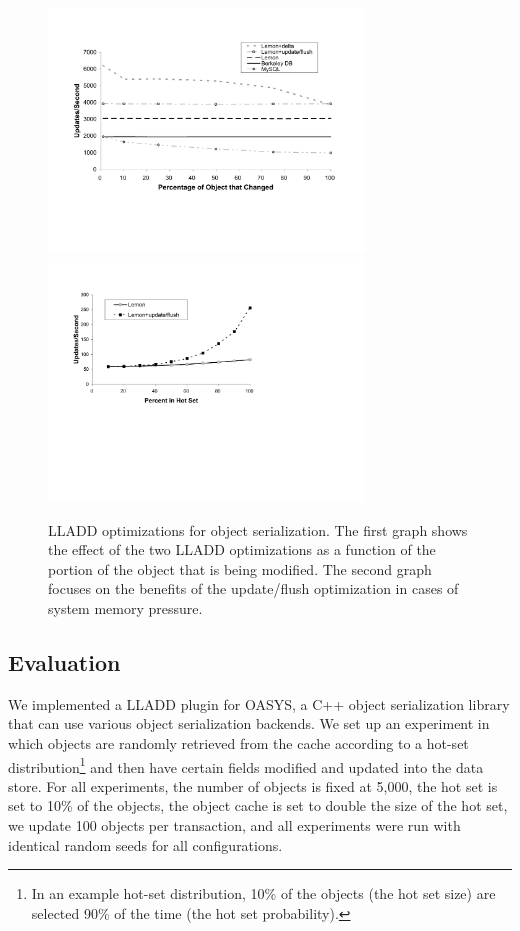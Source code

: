 \documentclass[10pt,letterpaper,twocolumn,english]{article}
\newcommand{\yad}{LLADD\xspace}
\newcommand{\oasys}{OASYS\xspace}
\begin{document}
\begin{figure}[t!]
\includegraphics[width=3.3in]{../paper2/object-diff.pdf}
\hspace{.3in}
\includegraphics[width=3.3in]{../paper2/mem-pressure.pdf}
\vspace{-.15in}
\caption{\sf \label{fig:OASYS}
\yad optimizations for object
serialization. The first graph shows the effect of the two \yad
optimizations as a function of the portion of the object that is being
modified. The second graph focuses on the 
benefits of the update/flush optimization in cases of system
memory pressure.}
\end{figure}

\subsection{Evaluation}

We implemented a \yad plugin for \oasys, a C++ object serialization
library that can use various object serialization backends. 
We set up an experiment in which objects are randomly
retrieved from the cache according to a hot-set distribution\footnote{In
an example hot-set distribution, 10\% of the objects (the hot set size) are
selected 90\% of the time (the hot set probability).} 
and then have certain fields modified and
updated into the data store. For all experiments, the number of objects
is fixed at 5,000, the
hot set is set to 10\% of the objects, the object cache is set to
double the size of the hot set, we update 100 objects per
transaction, and all experiments were run with identical random seeds 
for all configurations.
\end{document}
